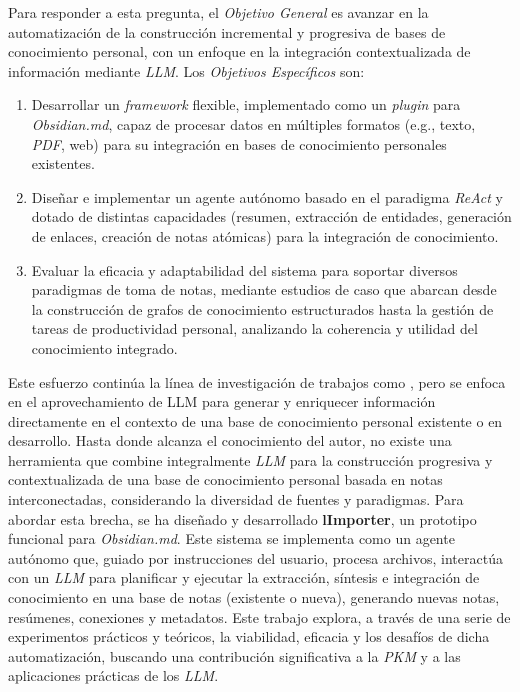 Para responder a esta pregunta, el \textit{Objetivo General} es avanzar en la automatización de la construcción incremental y progresiva de bases de conocimiento personal, con un enfoque en la integración contextualizada de información mediante \textit{LLM}. Los \textit{Objetivos Específicos} son:
\begin{enumerate}
    \item Desarrollar un \textit{framework} flexible, implementado como un \textit{plugin} para \textit{Obsidian.md}, capaz de procesar datos en múltiples formatos (e.g., texto, \textit{PDF}, web) para su integración en bases de conocimiento personales existentes.
    \item Diseñar e implementar un agente autónomo basado en el paradigma \textit{ReAct} y dotado de distintas capacidades (resumen, extracción de entidades, generación de enlaces, creación de notas atómicas) para la integración de conocimiento.
    \item Evaluar la eficacia y adaptabilidad del sistema para soportar diversos paradigmas de toma de notas, mediante estudios de caso que abarcan desde la construcción de grafos de conocimiento estructurados hasta la gestión de tareas de productividad personal, analizando la coherencia y utilidad del conocimiento integrado.
\end{enumerate}

Este esfuerzo continúa la línea de investigación de trabajos como \cite{fragaAutomaticGenerationKnowledge2023}, pero se enfoca en el aprovechamiento de LLM para generar y enriquecer información directamente en el contexto de una base de conocimiento personal existente o en desarrollo. Hasta donde alcanza el conocimiento del autor, no existe una herramienta que combine integralmente \textit{LLM} para la construcción progresiva y contextualizada de una base de conocimiento personal basada en notas interconectadas, considerando la diversidad de fuentes y paradigmas. Para abordar esta brecha, se ha diseñado y desarrollado \textbf{lImporter}, un prototipo funcional para \textit{Obsidian.md}. Este sistema se implementa como un agente autónomo que, guiado por instrucciones del usuario, procesa archivos, interactúa con un \textit{LLM} para planificar y ejecutar la extracción, síntesis e integración de conocimiento en una base de notas (existente o nueva), generando nuevas notas, resúmenes, conexiones y metadatos. Este trabajo explora, a través de una serie de experimentos prácticos y teóricos, la viabilidad, eficacia y los desafíos de dicha automatización, buscando una contribución significativa a la \textit{PKM} y a las aplicaciones prácticas de los \textit{LLM}.